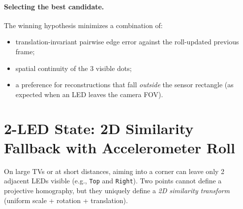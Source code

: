 \documentclass[11pt,a4paper]{article}
\newcommand{\code}[1]{\texttt{#1}}
\begin{document}
\paragraph{Selecting the best candidate.}
The winning hypothesis minimizes a combination of:
\begin{itemize}[nosep]
  \item translation-invariant pairwise edge error against the roll-updated
        previous frame;
  \item spatial continuity of the 3 visible dots;
  \item a preference for reconstructions that fall \emph{outside} the sensor
        rectangle (as expected when an LED leaves the camera FOV).
\end{itemize}

\section{2-LED State: 2D Similarity Fallback with Accelerometer Roll}
\label{sec:two}

On large TVs or at short distances, aiming into a corner can leave only 2
adjacent LEDs visible (e.g., \code{Top} and \code{Right}). Two points cannot
define a projective homography, but they uniquely define a \emph{2D similarity
transform} (uniform scale + rotation + translation).
\end{document}
